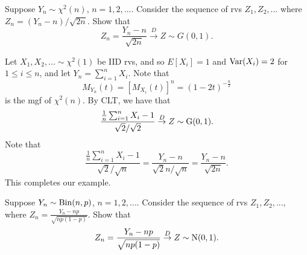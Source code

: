 \documentclass[notoc,notitlepage]{tufte-book}
\newcommand{\convd}{\overset{D}{\to}}
\begin{document}
\begin{eg}
  Suppose $Y_n \sim \chi^2(n)$, $n = 1, 2, ...$. Consider the sequence of rvs $Z_1, Z_2,...$ where $Z_n = (Y_n - n) / \sqrt{2n}$. Show that
  \begin{equation*}
    Z_n = \frac{Y_n - n}{\sqrt{2n}} \convd Z \sim G(0, 1).
  \end{equation*}
\end{eg}

\begin{solution}
   Let $X_1, X_2, ... \sim \chi^2(1)$ be IID rvs, and so $E[X_i] = 1$ and $\operatorname{Var}(X_i) = 2$ for $1 \leq i \leq n$, and let $Y_n = \sum_{i=1}^{n} X_i$. Note that
  \begin{equation*}
    M_{Y_n}(t) = [ M_{X_i}(t) ]^n = (1 - 2t)^{-\frac{n}{2}}
  \end{equation*}
  is the mgf of $\chi^2 (n)$. By CLT, we have that
  \begin{equation*}
    \frac{\frac{1}{n} \sum_{i=1}^{n} X_i - 1}{\sqrt{2} / \sqrt{2}} \convd Z \sim \Gau(0, 1).
  \end{equation*}
  Note that
  \begin{equation*}
    \frac{\frac{1}{n} \sum_{i=1}^{n} X_i - 1}{\sqrt{2} / \sqrt{n}} = \frac{Y_n - n}{\sqrt{2} n / \sqrt{n}} = \frac{Y_n - n}{\sqrt{2n}}.
  \end{equation*}
  This completes our example.
\end{solution}

\begin{eg}
  Suppose $Y_n \sim \operatorname{Bin}(n, p)$, $n = 1, 2, ...$. Consider the sequence of rvs $Z_1, Z_2, ...$, where $Z_n = \frac{Y_n - np}{\sqrt{np(1 - p)}}$. Show that
  \begin{equation*}
    Z_n = \frac{Y_n - np}{\sqrt{np(1 - p)}} \convd Z \sim \Nor(0, 1).
  \end{equation*}
\end{eg}
\end{document}
